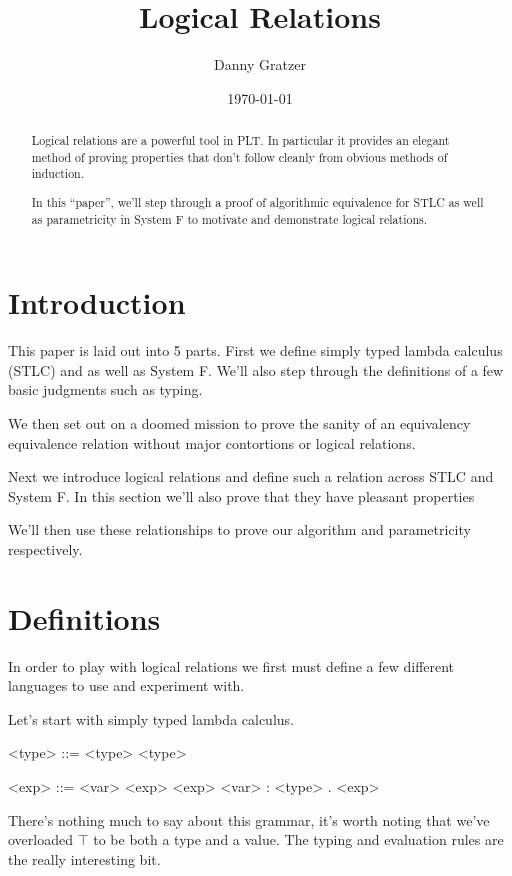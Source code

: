 \documentclass[12pt]{article}
\begin{document}
\title{Logical Relations}
\author{Danny Gratzer}
\date{\today}
\maketitle

\begin{abstract}
Logical relations are a powerful tool in PLT. In particular it
provides an elegant method of proving properties that don't follow
cleanly from obvious methods of induction.

In this ``paper'', we'll step through a proof of algorithmic
equivalence for STLC as well as parametricity in System F to motivate
and demonstrate logical relations.
\end{abstract}

\section{Introduction}
This paper is laid out into 5 parts. First we define simply typed
lambda calculus (STLC) and as well as System F. We'll also step
through the definitions of a few basic judgments such as typing. 

We then set out on a doomed mission to prove the sanity of an
equivalency equivalence relation without major contortions or logical
relations.

Next we introduce logical relations and define such a relation across
STLC and System F. In this section we'll also prove that they have
pleasant properties

We'll then use these relationships to prove our algorithm and
parametricity respectively.

\section{Definitions}
In order to play with logical relations we first must define a few
different languages to use and experiment with.

Let's start with simply typed lambda calculus.

\begin{grammar}
<type> ::= \top \alt <type> \rightarrow <type>

<exp>  ::= <var>
       \alt <exp> <exp>
       \alt \lambda <var> : <type> . <exp>
       \alt \top
\end{grammar}

There's nothing much to say about this grammar, it's worth noting that
we've overloaded $\top$ to be both a type and a value. The typing
and evaluation rules are the really interesting bit.
\end{document}
